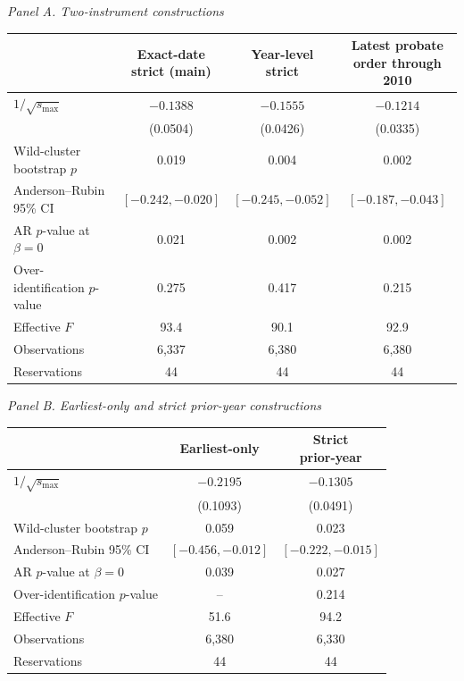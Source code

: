 \footnotesize
\setlength{\tabcolsep}{4pt}
\noindent\textit{Panel A. Two-instrument constructions}\par\smallskip
\begin{tabular*}{\textwidth}{@{\extracolsep{\fill}}lccc}
\toprule
 & \specialcell{Exact-date\\strict (main)} & \specialcell{Year-level\\strict} & \specialcell{Latest probate\\order through 2010} \\
\midrule
$1/\sqrt{s_{\max}}$ & $-0.1388$ & $-0.1555$ & $-0.1214$ \\
 & (0.0504) & (0.0426) & (0.0335) \\[0.3ex]
Wild-cluster bootstrap $p$ & 0.019 & 0.004 & 0.002 \\
Anderson--Rubin 95\% CI & $[-0.242,-0.020]$ & $[-0.245,-0.052]$ & $[-0.187,-0.043]$ \\
AR $p$-value at $\beta=0$ & 0.021 & 0.002 & 0.002 \\
Over-identification $p$-value & 0.275 & 0.417 & 0.215 \\
Effective $F$ & 93.4 & 90.1 & 92.9 \\
\midrule
Observations & 6,337 & 6,380 & 6,380 \\
Reservations & 44 & 44 & 44 \\
\bottomrule
\end{tabular*}

\vspace{0.8em}
\noindent\textit{Panel B. Earliest-only and strict prior-year constructions}\par\smallskip
\begin{tabular*}{\textwidth}{@{\extracolsep{\fill}}lcc}
\toprule
 & Earliest-only & \specialcell{Strict\\prior-year} \\
\midrule
$1/\sqrt{s_{\max}}$ & $-0.2195$ & $-0.1305$ \\
 & (0.1093) & (0.0491) \\[0.3ex]
Wild-cluster bootstrap $p$ & 0.059 & 0.023 \\
Anderson--Rubin 95\% CI & $[-0.456,-0.012]$ & $[-0.222,-0.015]$ \\
AR $p$-value at $\beta=0$ & 0.039 & 0.027 \\
Over-identification $p$-value & -- & 0.214 \\
Effective $F$ & 51.6 & 94.2 \\
\midrule
Observations & 6,380 & 6,330 \\
Reservations & 44 & 44 \\
\bottomrule
\end{tabular*}
\normalsize
